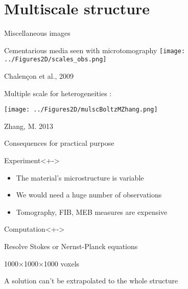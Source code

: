 \section{Multiscale structure}

\begin{frame}{Miscellaneous images}%
%
\begin{multicols}{2}
Cementarious media seen with microtomography
%
\texttt{[image: ../Figures2D/scales\_obs.png]}

\par
\footnotesize{Chalen\c con et al., 2009}

\columnbreak
Multiple scale for heterogeneities : 

\texttt{[image: ../Figures2D/mulscBoltzMZhang.png]}

\par
\footnotesize{Zhang, M. 2013}
\end{multicols}
%
%
\end{frame}

\begin{frame}{Consequences for practical purpose}
%
\begin{block}{Experiment}<+->
\begin{itemize}
\item<+-> The material's microstructure is variable
\item<+-> We would need a huge number of observations
\item<+-> Tomography, FIB, MEB measures are expensive
\end{itemize}
\end{block}
%
\begin{block}{Computation}<+->
\begin{description}
\item<+-> [Objectives] Resolve Stokes or Nernst-Planck equations
\item<+-> [High spatial resolution] 1000$\times$1000$\times$1000 voxels
\item<+-> [Small sample] A solution can't be extrapolated to the whole structure
\end{description}
\end{block}
%
\end{frame}